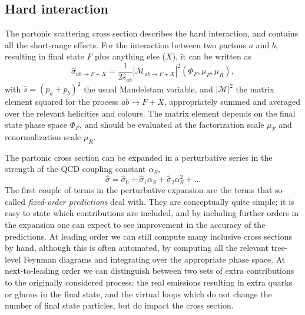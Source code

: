 \subsection{Hard interaction \label{sec:event_hard_interaction}}



The partonic scattering cross section describes the hard interaction, and contains all the
short-range effects. For the interaction between two partons $a$ and $b$, resulting in final state
$F$ plus anything else ($X$), it can be written as
\begin{equation}
  \hat{\sigma}_{ab\rightarrow F+X} = \frac{1}{2\hat{s}_{ab}} | \mathcal{M}_{ab\rightarrow
F+X}|^2(\Phi_F, \mu_F, \mu_R), 
\end{equation}
with $\hat{s} = (p_a + p_b)^2$ the usual Mandelstam variable, and 
$|\mathcal{M}|^2$ the matrix element squared for the process $a b \rightarrow F+X$, appropriately
summed and averaged over the relevant helicities and colours. 
The matrix element depends on the final state phase space $\Phi_F$, and should be evaluated at the
factorization scale $\mu_F$ and renormalization scale $\mu_R$.

The partonic cross section can be expanded in a perturbative series in the strength of the
QCD coupling constant $\alpha_S$, 
\begin{equation}
  \hat{\sigma} = \hat{\sigma}_0 + \hat{\sigma}_1 \alpha_S + \hat{\sigma}_2 \alpha_S^2 + \ldots
\end{equation}
The first couple of terms in the perturbative expansion are the terms that so-called
\textit{fixed-order predictions} deal with. They are conceptually quite simple; it is easy to state
which contributions are included, and by including further orders in the expansion one can expect to
see improvement in the accuracy of the predictions. 
At leading order we can still compute many inclusive cross sections by hand, although this is often
automated, by computing all the relevant tree-level Feynman diagrams and integrating over the
appropriate phase space. 
At next-to-leading order we can distinguish between two sets of extra contributions to the
originally considered process: the real emissions resulting in extra quarks or gluons in the final
state, and the virtual loops which do not change the number of final state particles, but do impact
the cross section. 

